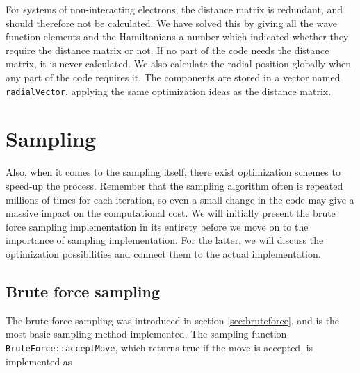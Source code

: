 For systems of non-interacting electrons, the distance matrix is redundant, and should therefore not be calculated. We have solved this by giving all the wave function elements and the Hamiltonians a number which indicated whether they require the distance matrix or not. If no part of the code needs the distance matrix, it is never calculated. We also calculate the radial position globally when any part of the code requires it. The components are stored in a vector named \lstinline{radialVector}, applying the same optimization ideas as the distance matrix. 

\section{Sampling} \label{sec:sampling}
Also, when it comes to the sampling itself, there exist optimization schemes to speed-up the process. Remember that the sampling algorithm often is repeated millions of times for each iteration, so even a small change in the code may give a massive impact on the computational cost. We will initially present the brute force sampling implementation in its entirety before we move on to the importance of sampling implementation. For the latter, we will discuss the optimization possibilities and connect them to the actual implementation.

\subsection{Brute force sampling}
The brute force sampling was introduced in section \ref{sec:bruteforce}, and is the most basic sampling method implemented. The sampling function \lstinline{BruteForce::acceptMove}, which returns true if the move is accepted, is implemented as

